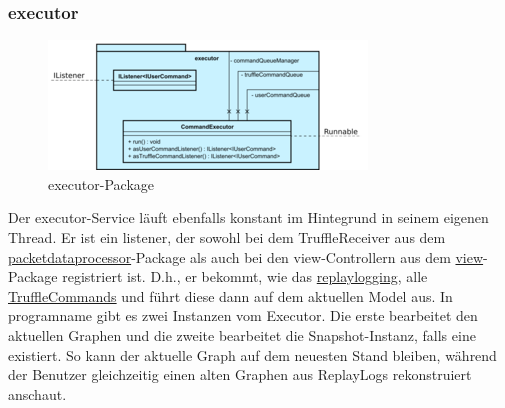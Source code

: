     \subsubsection{executor}
    \label{subsubsec:executor}

    \begin{figure}[H]
      \centering
      \includegraphics[width=\textwidth]{../diagramimages/executor.png}
      \caption{executor-Package}
    \end{figure}

    \medskip
    Der executor-Service läuft ebenfalls konstant im Hintegrund in seinem
    eigenen Thread. Er ist ein \gls{listener}, der sowohl bei dem TruffleReceiver aus dem
    \hyperref[subsubsec:packetdataprocessor]{packetdataprocessor}-Package als
    auch bei den view-Controllern aus dem \hyperref[subsec:view]{view}-Package
    registriert ist. D.h., er bekommt, wie das \hyperref[subsubsec:replaylogging]{replaylogging},
    alle \hyperref[subsubsec:trufflecommand]{TruffleCommands} und führt diese
    dann auf dem aktuellen Model aus.
    \newline
    \newline
    In \gls{programname} gibt es zwei Instanzen vom Executor. Die erste bearbeitet
    den aktuellen Graphen und die zweite bearbeitet die Snapshot-Instanz, falls
    eine existiert. So kann der aktuelle Graph auf dem neuesten Stand bleiben, während
    der Benutzer gleichzeitig einen alten Graphen aus
    ReplayLogs rekonstruiert anschaut.
